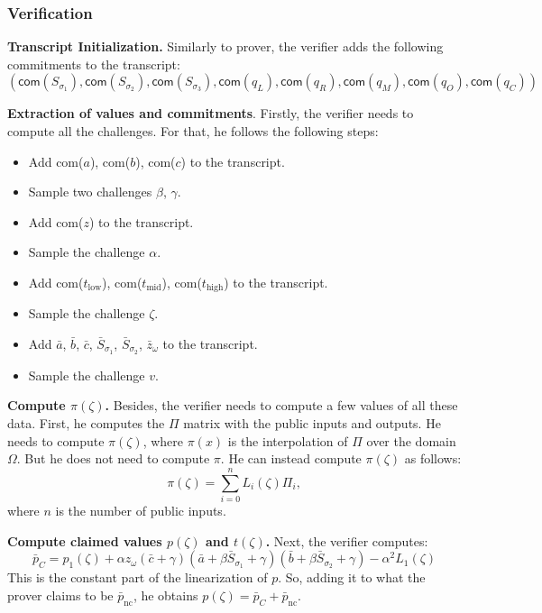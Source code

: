 \documentclass[../lecture-notes.tex]{subfiles}
\begin{document}
\subsubsection{Verification}

\textcolor{blue!60!black}{\textbf{Transcript Initialization.}} Similarly to
prover, the verifier adds the following commitments to the transcript:
\begin{equation*}
    (\mathsf{com}(S_{\sigma_1}), \mathsf{com}(S_{\sigma_2}), \mathsf{com}(S_{\sigma_3}), \mathsf{com}(q_L), \mathsf{com}(q_R), \mathsf{com}(q_M), \mathsf{com}(q_O), \mathsf{com}(q_C))
\end{equation*}

\textcolor{blue!60!black}{\textbf{Extraction of values and commitments}.}
Firstly, the verifier needs to compute all the challenges. For that, he follows
the following steps:
\begin{itemize}
    \item Add com($a$), com($b$), com($c$) to the transcript.
    \item Sample two challenges $\beta$, $\gamma$.
    \item Add com($z$) to the transcript.
    \item Sample the challenge $\alpha$.
    \item Add com($t_{\text{low}}$), com($t_{\text{mid}}$), com($t_{\text{high}}$) to the transcript.
    \item Sample the challenge $\zeta$.
    \item Add $\bar{a}$, $\bar{b}$, $\bar{c}$, $\bar{S}_{\sigma_1}$, $\bar{S}_{\sigma_2}$, $\bar{z}_{\omega}$ to the transcript.
    \item Sample the challenge $v$.
\end{itemize}

\textcolor{blue!60!black}{\textbf{Compute $\pi(\zeta)$.}} Besides, the verifier
needs to compute a few values of all these data. First, he computes the $\Pi$
matrix with the public inputs and outputs. He needs to compute $\pi(\zeta)$,
where $\pi(x)$ is the interpolation of $\Pi$ over the domain $\Omega$. But he
does not need to compute $\pi$. He can instead compute $\pi(\zeta)$ as follows:
\begin{equation*}
    \pi(\zeta) = \sum_{i=0}^n L_i(\zeta)\Pi_{i},
\end{equation*}
where $n$ is the number of public inputs.

\textcolor{blue!60!black}{\textbf{Compute claimed values $p(\zeta)$ and
$t(\zeta)$.}} Next, the verifier computes: 
\[\bar{p}_C = p_1(\zeta) + \alpha z_{\omega} \left( \bar{c} + \gamma \right)
\left( \bar{a} + \beta \bar{S}_{\sigma_1} + \gamma \right) \left( \bar{b} +
\beta \bar{S}_{\sigma_2} + \gamma \right) - \alpha^2 L_1(\zeta)\] This is the
constant part of the linearization of $p$. So, adding it to what the prover
claims to be $\bar{p}_{\text{nc}}$, he obtains $p(\zeta) = \bar{p}_C + \bar{p}_{\text{nc}}$.
\end{document}
